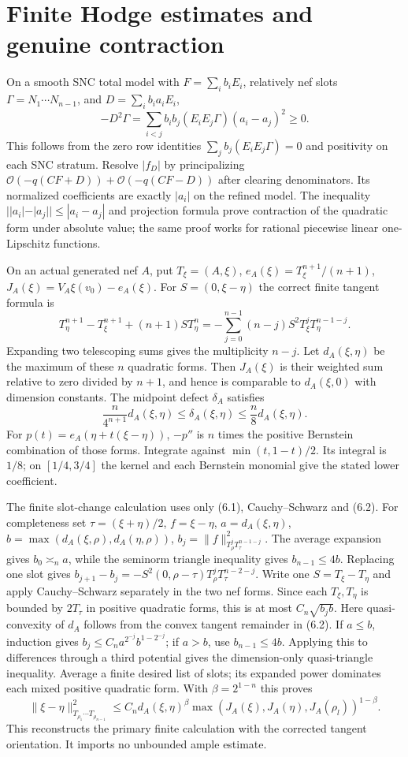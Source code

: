 \documentclass[10pt]{article}
\newcommand{\OO}{\mathcal O}
\begin{document}
\section{Finite Hodge estimates and genuine contraction}
On a smooth SNC total model with $F=\sum_i b_iE_i$, relatively nef
slots $\Gamma=N_1\cdots N_{n-1}$, and $D=\sum_i b_i a_iE_i$,
\[
 -D^2\Gamma=\sum_{i<j}b_ib_j(E_iE_j\Gamma)(a_i-a_j)^2\geq0.
 \tag{6.1}
\]
This follows from the zero row identities
$\sum_j b_j(E_iE_j\Gamma)=0$ and positivity on each SNC stratum.
Resolve $|f_D|$ by principalizing
$\OO(-q(CF+D))+\OO(-q(CF-D))$ after clearing denominators.
Its normalized coefficients are exactly $|a_i|$ on the refined model.
The inequality $||a_i|-|a_j||\leq|a_i-a_j|$ and projection formula
prove contraction of the quadratic form under absolute value; the same
proof works for rational piecewise linear one-Lipschitz functions.

On an actual generated nef $A$, put $T_\xi=(A,\xi)$,
$e_A(\xi)=T_\xi^{n+1}/(n+1)$, $J_A(\xi)=V_A\xi(v_0)-e_A(\xi)$.
For $S=(0,\xi-\eta)$ the correct finite tangent formula is
\[
 T_\eta^{n+1}-T_\xi^{n+1}+(n+1)ST_\eta^n
 =-\sum_{j=0}^{n-1}(n-j)S^2T_\xi^jT_\eta^{n-1-j}.
 \tag{6.2}
\]
Expanding two telescoping sums gives the multiplicity $n-j$.
Let $d_A(\xi,\eta)$ be the maximum of these $n$ quadratic forms.
Then $J_A(\xi)$ is their weighted sum relative to zero divided by
$n+1$, and hence is comparable to $d_A(\xi,0)$ with dimension constants.
The midpoint defect $\delta_A$ satisfies
\[
 \frac{n}{4^{n+1}}d_A(\xi,\eta)\leq\delta_A(\xi,\eta)
 \leq\frac n8 d_A(\xi,\eta).
 \tag{6.3}
\]
For $p(t)=e_A(\eta+t(\xi-\eta))$, $-p''$ is $n$ times the positive
Bernstein combination of those forms. Integrate against
$\min(t,1-t)/2$. Its integral is $1/8$; on $[1/4,3/4]$ the kernel
and each Bernstein monomial give the stated lower coefficient.

The finite slot-change calculation uses only (6.1), Cauchy--Schwarz and
(6.2). For completeness set $\tau=(\xi+\eta)/2$, $f=\xi-\eta$,
$a=d_A(\xi,\eta)$, $b=\max(d_A(\xi,\rho),d_A(\eta,\rho))$,
$b_j=\|f\|^2_{T_\rho^jT_\tau^{n-1-j}}$.
The average expansion gives $b_0\asymp_n a$, while the seminorm
triangle inequality gives $b_{n-1}\leq4b$. Replacing one slot gives
$b_{j+1}-b_j=-S^2(0,\rho-\tau)T_\rho^jT_\tau^{n-2-j}$.
Write one $S=T_\xi-T_\eta$ and apply Cauchy--Schwarz separately in
the two nef forms. Since each $T_\xi,T_\eta$ is bounded by $2T_\tau$
in positive quadratic forms, this is at most $C_n\sqrt{b_jb}$.
Here quasi-convexity of $d_A$ follows from the convex tangent remainder
in (6.2). If $a\leq b$, induction gives
$b_j\leq C_n a^{2^{-j}}b^{1-2^{-j}}$; if $a>b$, use $b_{n-1}\leq4b$.
Applying this to differences through a third potential gives the
dimension-only quasi-triangle inequality. Average a finite desired list
of slots; its expanded power dominates each mixed positive quadratic
form. With $\beta=2^{1-n}$ this proves
\[
 \|\xi-\eta\|^2_{T_{\rho_1}\cdots T_{\rho_{n-1}}}
 \leq C_n d_A(\xi,\eta)^\beta
       \max(J_A(\xi),J_A(\eta),J_A(\rho_l))^{1-\beta}.
 \tag{6.4}
\]
This reconstructs the primary finite calculation with the corrected
tangent orientation. It imports no unbounded ample estimate.
\end{document}
